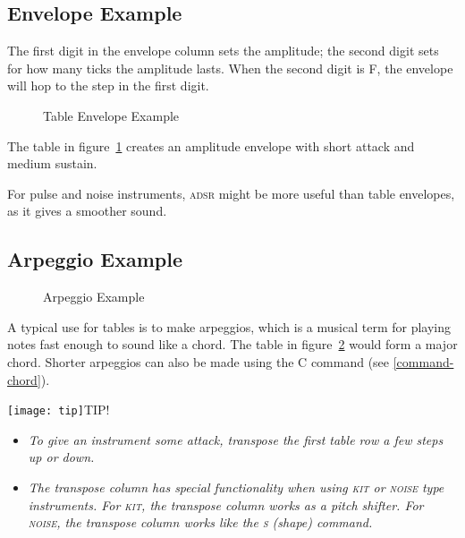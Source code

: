 \subsection{Envelope Example}

The first digit in the envelope column sets the amplitude; the second digit sets for how many ticks the amplitude lasts.
When the second digit is F, the envelope will hop to the step in the first digit.

\begin{figure}[htpb]
	\begin{center}
	\end{center}
	\caption{Table Envelope Example}
	\label{fig:table-amp}
\end{figure}

The table in figure~\ref{fig:table-amp} creates an amplitude envelope with short attack and medium sustain.

For pulse and noise instruments, \textsc{adsr} might be more useful than table envelopes, as it gives a smoother sound.

\subsection{Arpeggio Example}

\begin{figure}[htpb]
	\begin{center}
	\end{center}
	\caption{Arpeggio Example}
	\label{fig:table-arp}
\end{figure}

A typical use for tables is to make arpeggios, which is a musical term for playing notes fast enough to sound like a chord. The table in figure~\ref{fig:table-arp} would form a major chord. Shorter arpeggios can also be made using the C command (see \ref{command-chord}).

\texttt{[image: tip]}TIP!
\begin{itemize}
	\item \textit{To give an instrument some attack, transpose the first table row a few steps up or down.}
	\item \textit{The transpose column has special functionality when using \textsc{kit} or \textsc{noise} type instruments. For \textsc{kit}, the transpose column works as a pitch shifter. For \textsc{noise}, the transpose column works like the \textsc{s} (shape) command.}
\end{itemize}

